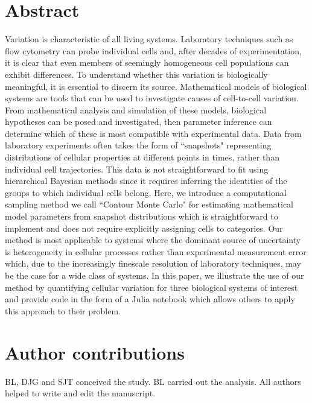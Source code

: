 \documentclass[10pt,letterpaper]{article}
\begin{document}
\newpage
\linenumbers
\section{Abstract}
Variation is characteristic of all living systems. Laboratory techniques such as flow cytometry can probe individual cells and, after decades of experimentation, it is clear that even members of seemingly homogeneous cell populations can exhibit differences. To understand whether this variation is biologically meaningful, it is essential to discern its source. Mathematical models of biological systems are tools that can be used to investigate causes of cell-to-cell variation. From mathematical analysis and simulation of these models, biological hypotheses can be posed and investigated, then parameter inference can determine which of these is most compatible with experimental data. Data from laboratory experiments often takes the form of ``snapshots" representing distributions of cellular properties at different points in times, rather than individual cell trajectories. This data is not straightforward to fit using hierarchical Bayesian methods since it requires inferring the identities of the groups to which individual cells belong. Here, we introduce a computational sampling method we call ``Contour Monte Carlo" for estimating mathematical model parameters from snapshot distributions which is straightforward to implement and does not require explicitly assigning cells to categories. Our method is most applicable to systems where the dominant source of uncertainty is heterogeneity in cellular processes rather than experimental measurement error which, due to the increasingly finescale resolution of laboratory techniques, may be the case for a wide class of systems. In this paper, we illustrate the use of our method by quantifying cellular variation for three biological systems of interest and provide code in the form of a Julia notebook which allows others to apply this approach to their problem.



%
%


\section{Author contributions}
BL, DJG and SJT conceived the study. BL carried out the analysis. All authors helped to write and edit the manuscript.


\nolinenumbers



\end{document}
